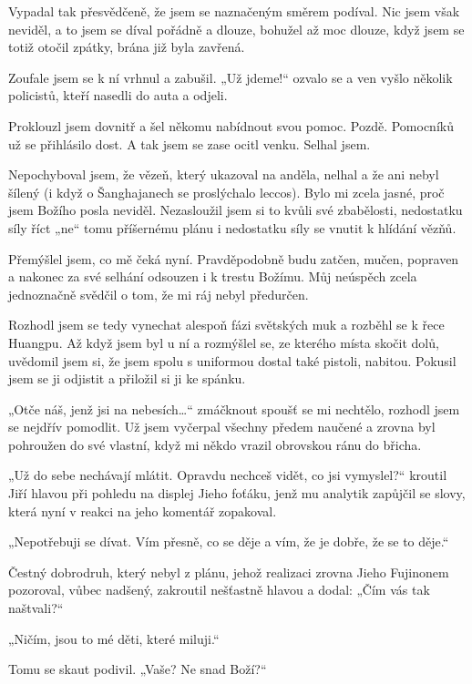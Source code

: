 Vypadal tak přesvědčeně, že jsem se naznačeným směrem podíval. Nic jsem však neviděl, a to jsem se díval pořádně a dlouze, bohužel až moc dlouze, když jsem se totiž otočil zpátky, brána již byla zavřená.

Zoufale jsem se k ní vrhnul a zabušil. „Už jdeme!“ ozvalo se a ven vyšlo několik policistů, kteří nasedli do auta a odjeli. 

Proklouzl jsem dovnitř a šel někomu nabídnout svou pomoc. Pozdě. Pomocníků už se přihlásilo dost. A tak jsem se zase ocitl venku. Selhal jsem. 

Nepochyboval jsem, že vězeň, který ukazoval na anděla, nelhal a že ani nebyl šílený (i když o Šanghajanech se proslýchalo leccos). Bylo mi zcela jasné, proč jsem Božího posla neviděl. Nezasloužil jsem si to kvůli své zbabělosti, nedostatku síly říct „ne“ tomu příšernému plánu i nedostatku síly se vnutit k hlídání vězňů.

Přemýšlel jsem, co mě čeká nyní. Pravděpodobně budu zatčen, mučen, popraven a nakonec za své selhání odsouzen i k trestu Božímu. Můj neúspěch zcela jednoznačně svědčil o tom, že mi ráj nebyl předurčen.

Rozhodl jsem se tedy vynechat alespoň fázi světských muk a rozběhl se k řece Huangpu. Až když jsem byl u ní a rozmýšlel se, ze kterého místa skočit dolů, uvědomil jsem si, že jsem spolu s uniformou dostal také pistoli, nabitou. Pokusil jsem se ji odjistit a přiložil si ji ke spánku.

„Otče náš, jenž jsi na nebesích…“ zmáčknout spoušť se mi nechtělo, rozhodl jsem se nejdřív pomodlit. Už jsem vyčerpal všechny předem naučené a zrovna byl pohroužen do své vlastní, když mi někdo vrazil obrovskou ránu do břicha.
\vspace{0.75cm}

„Už do sebe nechávají mlátit. Opravdu nechceš vidět, co jsi vymyslel?“ kroutil Jiří hlavou při pohledu na displej Jieho foťáku, jenž mu analytik zapůjčil se slovy, která nyní v reakci na jeho komentář zopakoval.

„Nepotřebuji se dívat. Vím přesně, co se děje a vím, že je dobře, že se to děje.“ 

Čestný dobrodruh, který nebyl z plánu, jehož realizaci zrovna Jieho Fujinonem pozoroval, vůbec nadšený, zakroutil nešťastně hlavou a dodal: „Čím vás tak naštvali?“

„Ničím, jsou to mé děti, které miluji.“

Tomu se skaut podivil. „Vaše? Ne snad Boží?“

